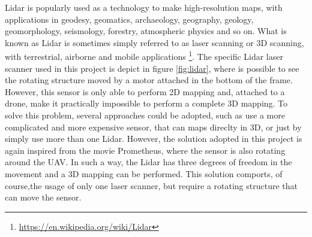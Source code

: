 \noindent Lidar is popularly used as a technology to make high-resolution maps, with applications in geodesy, geomatics, archaeology, geography, geology, geomorphology, seismology, forestry, atmospheric physics and so on. What is known as Lidar is sometimes simply referred to as laser scanning or 3D scanning, with terrestrial, airborne and mobile applications \footnote{\url{https://en.wikipedia.org/wiki/Lidar}}. The specific Lidar laser scanner used in this project is depict in figure \ref{fig:lidar}, where is possible to see the rotating structure moved by a motor attached in the bottom of the frame. However, this sensor is only able to perform 2D mapping and, attached to a drone, make it practically impossible to perform a complete 3D mapping. To solve this problem, several approaches could be adopted, such as use a more complicated and more expensive sensor, that can maps direclty in 3D, or just by simply use more than one Lidar. However, the solution adopted in this project is again inspired from the movie Prometheus, where the sensor is also rotating around the UAV. In such a way, the Lidar has three degrees of freedom in the movement and a 3D mapping can be performed. This solution comports, of course,the usage of only one laser scanner, but require a rotating structure that can move the sensor.

